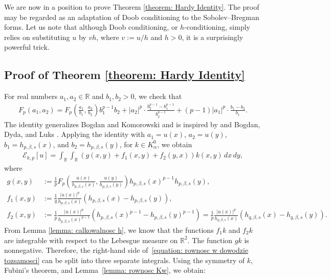 \documentclass[12pt, a4paper]{amsart}
\newcommand{\kbm}[1]{\marginpar{\scriptsize\textcolor{red}{#1}}}
\newcommand{\R}{\mathbb{R}}
\newcommand{\E}{\mathcal{E}}
\begin{document}
We are now in a position to prove Theorem \cref{theorem: Hardy Identity}. The proof may be regarded as an adaptation of Doob conditioning to the  Sobolev--Bregman forms. 
Let us note that although Doob conditioning, or \( h \)-conditioning, simply relies on substituting \( u \) by \( v h \), where \( v := u/h \) and \( h > 0 \), it is a surprisingly powerful trick.
\subsection*{Proof of Theorem \cref{theorem: Hardy Identity}}
For real numbers $a_1, a_2 \in \R$ and $b_1, b_2 > 0$, we check that
\begin{align}
\label{equation: rownosc liczbowa}
    F_p(a_1, a_2) = F_p \left( \frac{a_1}{b_1}, \frac{a_2}{b_2}\right)b_{1}^{p-1}b_{2}+\left|a_{2}\right|^{p}\cdot\frac{b_{2}^{p-1}-b_{1}^{p-1}}{b_{2}^{p-1}}+\left(p-1\right)\left|a_{1}\right|^{p}\cdot\frac{b_{1}-b_{2}}{b_{1}}.
\end{align}
The identity generalizes Bogdan and Komorowski \cite[(5.20)]{MR3238505} and is inspired by \cite[(2.3) and the proof of Lemma 2.1]{MR4720167} and Bogdan, Dyda, and Luks \cite[Lemma 13]{MR3251822}. 
Applying the identity with $a_1 = u(x)$, $a_2 = u(y)$, $b_1 = h_{p, \beta, s}(x)$, and $b_2 = h_{p, \beta, s}(y)$, for $k \in K_\alpha^0$, we obtain
\begin{align}
\label{equation: rownosc w dowodzie tozsamosci}
    \E_{k, p}[u] = \int_{\R} \int_{\R} \left( g(x, y) + f_1(x, y) + f_2(y, x) \right) k(x, y)\,dx\,dy,
\end{align}
where
\begin{align*}
    g(x, y) &:= \frac{1}{p} F_p\left( \frac{u(x)}{h_{p, \beta, s}(x)}, \frac{u(y)}{h_{p, \beta, s}(y)} \right) h_{p, \beta, s}(x)^{p-1} h_{p, \beta, s}(y), 
\\
f_1(x, y) &:= \frac{1}{q} \frac{|u(x)|^p}{h_{p, \beta, s}(x)}(h_{p, \beta, s}(x) - h_{p, \beta, s}(y)),
\\
f_2(x, y) &:= \frac{1}{p} \frac{|u(x)|^p}{h_{p, \beta, s}(x)^{p-1}}(h_{p, \beta, s}(x)^{p-1} - h_{p, \beta, s}(y)^{p-1}) = \frac{1}{p} \frac{|u(x)|^p}{h_{q, \beta, s}(x)}(h_{q, \beta, s}(x) - h_{q, \beta, s}(y)).
\end{align*}
From Lemma \cref{lemma: calkowalnosc h}, we know that the functions $f_1k$ and $f_2k$ are integrable  with respect to the Lebesgue measure on $\R^2$. The function $gk$ is nonnegative. Therefore, the right-hand side of~\eqref{equation: rownosc w dowodzie tozsamosci} can be split into three separate integrals. Using the symmetry of $k$, Fubini's theorem, and Lemma~\ref{lemma: rownosc Kw}, we obtain:
\end{document}
